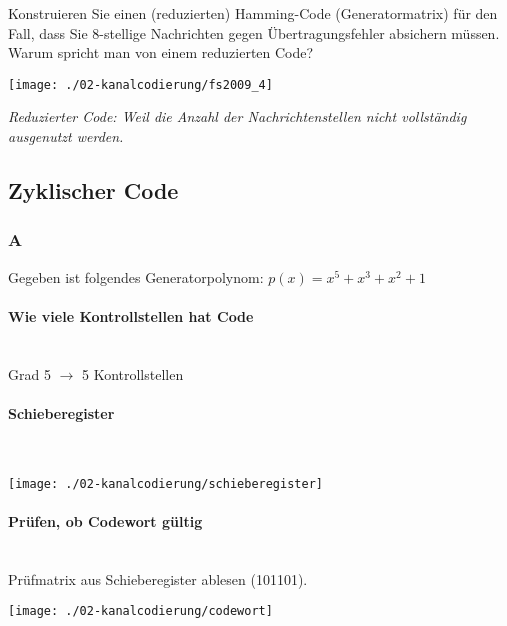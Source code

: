 Konstruieren Sie einen (reduzierten) Hamming-Code (Generatormatrix) für den Fall, dass Sie 8-stellige Nachrichten gegen Übertragungsfehler absichern müssen. Warum spricht man von einem reduzierten Code?\\
\begin{center}
    \vspace{-8pt}
    \texttt{[image: ./02-kanalcodierung/fs2009\_4]}
    \vspace{-8pt}
\end{center}
\textit{Reduzierter Code: Weil die Anzahl der Nachrichtenstellen nicht vollständig ausgenutzt werden.}

\subsection{Zyklischer Code}
\subsubsection{A}
Gegeben ist folgendes Generatorpolynom:
$p(x)=x^5+x^3+x^2+1$

\paragraph{Wie viele Kontrollstellen hat Code}\mbox{}\\
Grad 5 $\rightarrow$ 5 Kontrollstellen

\paragraph{Schieberegister}\mbox{}\\
\begin{center}
    \vspace{-8pt}
    \texttt{[image: ./02-kanalcodierung/schieberegister]}
    \vspace{-8pt}
\end{center}

\paragraph{Prüfen, ob Codewort gültig}\mbox{}\\
Prüfmatrix aus Schieberegister ablesen (101101).
\begin{center}
    \vspace{-8pt}
    \texttt{[image: ./02-kanalcodierung/codewort]}
    \vspace{-8pt}
\end{center}

